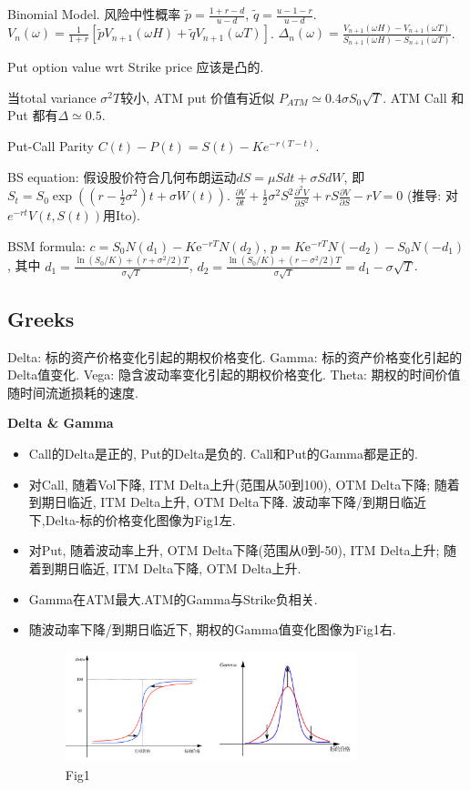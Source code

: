 \documentclass[UTF8]{ctexart}
\begin{document}
Binomial Model.
风险中性概率 $\tilde{p} = \frac{1+r-d}{u-d}$, $\tilde{q} = \frac{u-1-r}{u-d}$.
$V_n(\omega)=\frac{1}{1+r}[\tilde{p}V_{n+1}(\omega H) + \tilde{q}V_{n+1}(\omega T)]$.
$\Delta_n(\omega) = \frac{V_{n+1}(\omega H)-V_{n+1}(\omega T)}{S_{n+1}(\omega H)-S_{n+1}(\omega T)}$.


Put option value wrt Strike price 应该是凸的.

当total variance $\sigma^2 T$较小, ATM put 价值有近似 $P_{ATM}\simeq 0.4\sigma S_0\sqrt{T}$.
ATM Call 和 Put 都有$\Delta\simeq 0.5$.

Put-Call Parity $C(t)-P(t) = S(t) - Ke^{-r(T-t)}$.

BS equation: 假设股价符合几何布朗运动$dS=\mu S d t+\sigma S dW$, 即$S_t = S_0 \exp ((r-\frac{1}{2}\sigma^2)t+\sigma W(t))$.
$\frac{\partial V}{\partial t}+\frac{1}{2} \sigma^{2} S^{2} \frac{\partial^{2} V}{\partial S^{2}}+r S \frac{\partial V}{\partial S}-r V=0$
(推导: 对$e^{-rt}V(t,S(t))$用Ito).

BSM formula: 
$c=S_0 N\left(d_1\right)-K \mathrm{e}^{-r T} N\left(d_2\right) $, 
$p=K \mathrm{e}^{-r T} N\left(-d_2\right)-S_0 N\left(-d_1\right) $, 其中
$d_1=\frac{\ln \left(S_0 / K\right)+\left(r+\sigma^2 / 2\right) T}{\sigma \sqrt{T}} $, 
$d_2=\frac{\ln \left(S_0 / K\right)+\left(r-\sigma^2 / 2\right) T}{\sigma \sqrt{T}}=d_1-\sigma \sqrt{T}$. 


\subsection{Greeks}
Delta: 标的资产价格变化引起的期权价格变化.
Gamma: 标的资产价格变化引起的Delta值变化.
Vega: 隐含波动率变化引起的期权价格变化.
Theta: 期权的时间价值随时间流逝损耗的速度.

\noindent \textbf{Delta \& Gamma} \par 
\begin{itemize}
\item Call的Delta是正的, Put的Delta是负的. Call和Put的Gamma都是正的.
\item 对Call, 随着Vol下降, ITM Delta上升(范围从50到100), OTM Delta下降;
随着到期日临近, ITM Delta上升, OTM Delta下降.
波动率下降/到期日临近下,Delta-标的价格变化图像为Fig1左.
\item 对Put, 随着波动率上升, OTM Delta下降(范围从0到-50), ITM Delta上升;
随着到期日临近, ITM Delta下降, OTM Delta上升.
\item Gamma在ATM最大.ATM的Gamma与Strike负相关.
\item 随波动率下降/到期日临近下, 期权的Gamma值变化图像为Fig1右.
\begin{figure}[H]
    \centering
    \includegraphics[width=0.8\textwidth]{fig/fig1.png}
    \caption{Fig1}
\end{figure}

\end{itemize}
\end{document}
